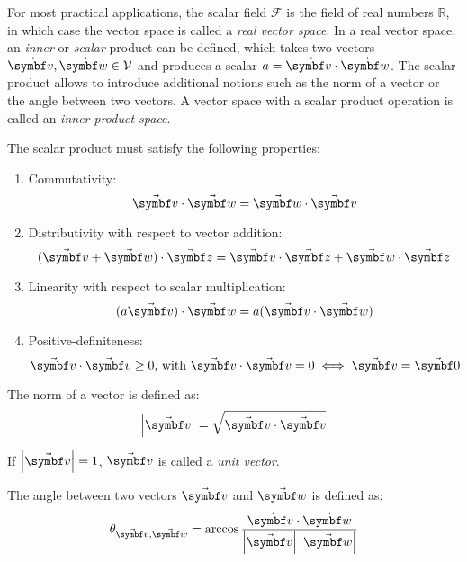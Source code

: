 For most practical applications, the scalar field $\mathcal{F}$ is the field of real numbers $\mathbb{R}$, in which case the vector space is called a \emph{real vector space}. In a real vector space, an \emph{inner} or \emph{scalar} product can be defined, which takes two vectors $\vabs{v},\vabs{w} \in\mathcal{V}$ and produces a scalar $a=\vabs{v}\cdot\vabs{w}$. The scalar product allows to introduce additional notions such as the norm of a vector or the angle between two vectors. A vector space with a scalar product operation is called an \emph{inner product space}.

The scalar product must satisfy the following properties:
\begin{enumerate}[1)]
	\item Commutativity:
	\begin{equation} \label{Eq.Res.Inner.Sym}
	\vabs{v}\cdot\vabs{w}=\vabs{w}\cdot\vabs{v}
	\end{equation}
	\item Distributivity with respect to vector addition:
	\begin{equation} \label{Eq.Res.Inner.Dist}
	(\vabs{v}+\vabs{w})\cdot\vabs{z}=\vabs{v}\cdot\vabs{z}+\vabs{w}\cdot\vabs{z}
	\end{equation}
	\item Linearity with respect to scalar multiplication:
	\begin{equation} \label{Eq.Res.Inner.Lin}
	(a\vabs{v})\cdot\vabs{w}=a(\vabs{v}\cdot\vabs{w})
	\end{equation}
	\item Positive-definiteness:
	\begin{equation} \label{Eq.Res.Inner.PosDef}
	\vabs{v}\cdot\vabs{v} \ge 0 \text{, with } \vabs{v}\cdot\vabs{v} = 0 \iff \vabs{v} = \vabs{0}
	\end{equation}
\end{enumerate}

The norm of a vector is defined as:
\begin{equation} \label{Eq.Def.Norm}
\norm{\vabs{v}}=\sqrt{\vabs{v}\cdot\vabs{v}}
\end{equation}

If $\norm{\vabs{v}}=1$, $\vabs{v}$ is called a \emph{unit vector}.

The angle between two vectors $\vabs{v}$ and $\vabs{w}$ is defined as:
\begin{equation} \label{Eq.Def.Angle}
\theta_{\vabs{v},  \vabs{w}} = \arccos \frac{\vabs{v}\cdot\vabs{w}}{\norm{\vabs{v}}\norm{\vabs{w}}}
\end{equation}

